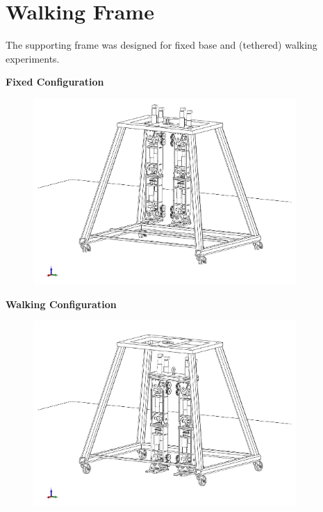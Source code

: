 \section{Walking Frame} 
\label{app:framecad}
The supporting frame was designed for fixed base and (tethered) walking experiments. 


\textbf{Fixed Configuration}

\begin{figure}[!h]
	\begin{center}
    \includegraphics[trim = 5mm 20mm 5mm 5mm,clip,width=10cm]{fig/drawings/frame-fixed.pdf}
	\end{center}
\end{figure}

\textbf{Walking Configuration}

\begin{figure}[!h]
	\begin{center}
    \includegraphics[trim = 5mm 20mm 5mm 5mm,clip,width=10cm]{fig/drawings/frame-walking.pdf}
	\end{center}
\end{figure}

